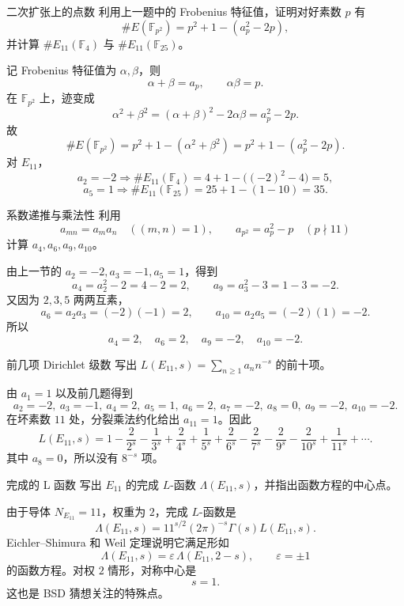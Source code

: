 \begin{problem}{二次扩张上的点数}
\easy
利用上一题中的 Frobenius 特征值，证明对好素数 $p$ 有
\[
\#E(\mathbb{F}_{p^2})=p^2+1-(a_p^2-2p),
\]
并计算 $\#E_{11}(\mathbb{F}_4)$ 与 $\#E_{11}(\mathbb{F}_{25})$。
\end{problem}
\begin{solution}
记 Frobenius 特征值为 $\alpha,\beta$，则
\[
\alpha+\beta=a_p,
\qquad
\alpha\beta=p.
\]
在 $\mathbb{F}_{p^2}$ 上，迹变成
\[
\alpha^2+\beta^2=(\alpha+\beta)^2-2\alpha\beta=a_p^2-2p.
\]
故
\[
\#E(\mathbb{F}_{p^2})=p^2+1-(\alpha^2+\beta^2)=p^2+1-(a_p^2-2p).
\]
对 $E_{11}$，
\[
a_2=-2 \Rightarrow \#E_{11}(\mathbb{F}_4)=4+1-\bigl((-2)^2-4\bigr)=5,
\]
\[
a_5=1 \Rightarrow \#E_{11}(\mathbb{F}_{25})=25+1-(1-10)=35.
\]
\end{solution}

\begin{problem}{系数递推与乘法性}
\easy
利用
\[
a_{mn}=a_ma_n\quad ((m,n)=1),
\qquad
a_{p^2}=a_p^2-p\quad (p\nmid 11)
\]
计算 $a_4,a_6,a_9,a_{10}$。
\end{problem}
\begin{solution}
由上一节的 $a_2=-2,a_3=-1,a_5=1$，得到
\[
a_4=a_2^2-2=4-2=2,
\qquad
a_9=a_3^2-3=1-3=-2.
\]
又因为 $2,3,5$ 两两互素，
\[
a_6=a_2a_3=(-2)(-1)=2,
\qquad
a_{10}=a_2a_5=(-2)(1)=-2.
\]
所以
\[
a_4=2,\quad a_6=2,\quad a_9=-2,\quad a_{10}=-2.
\]
\end{solution}

\begin{problem}{前几项 Dirichlet 级数}
\easy
写出 $L(E_{11},s)=\sum_{n\ge 1}a_nn^{-s}$ 的前十项。
\end{problem}
\begin{solution}
由 $a_1=1$ 以及前几题得到
\[
a_2=-2,\ a_3=-1,\ a_4=2,\ a_5=1,\ a_6=2,\ a_7=-2,\ a_8=0,\ a_9=-2,\ a_{10}=-2.
\]
在坏素数 $11$ 处，分裂乘法约化给出 $a_{11}=1$。因此
\[
L(E_{11},s)=1-\frac{2}{2^s}-\frac{1}{3^s}+\frac{2}{4^s}+\frac{1}{5^s}+\frac{2}{6^s}-\frac{2}{7^s}
-\frac{2}{9^s}-\frac{2}{10^s}+\frac{1}{11^s}+\cdots.
\]
其中 $a_8=0$，所以没有 $8^{-s}$ 项。
\end{solution}

\begin{problem}{完成的 L 函数}
\easy
写出 $E_{11}$ 的完成 $L$-函数 $\Lambda(E_{11},s)$，并指出函数方程的中心点。
\end{problem}
\begin{solution}
由于导体 $N_{E_{11}}=11$，权重为 $2$，完成 $L$-函数是
\[
\Lambda(E_{11},s)=11^{s/2}(2\pi)^{-s}\Gamma(s)L(E_{11},s).
\]
Eichler--Shimura 和 Weil 定理说明它满足形如
\[
\Lambda(E_{11},s)=\varepsilon\,\Lambda(E_{11},2-s),
\qquad \varepsilon=\pm 1
\]
的函数方程。对权 $2$ 情形，对称中心是
\[
s=1.
\]
这也是 BSD 猜想关注的特殊点。
\end{solution}

